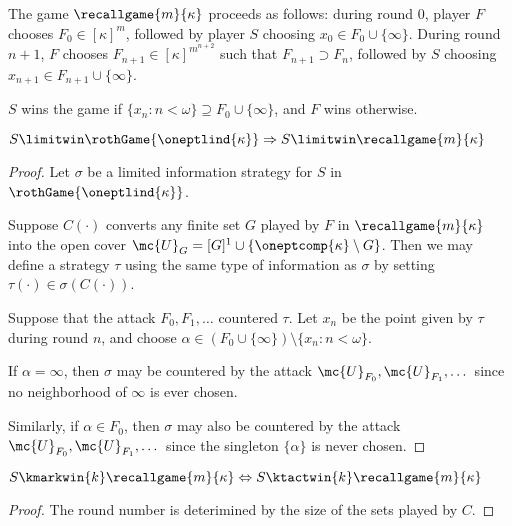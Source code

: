   \begin{defn}
    The game $\recallgame{m}{\kappa}$ proceeds as follows: during round $0$, player $F$ chooses $F_0\in[\kappa]^m$, followed by player $S$ choosing $x_0\in F_0\cup\{\infty\}$. During round $n+1$, $F$ chooses $F_{n+1}\in[\kappa]^{m^{n+2}}$ such that $F_{n+1}\supset F_n$, followed by $S$ choosing $x_{n+1}\in F_{n+1}\cup\{\infty\}$.

    $S$ wins the game if $\{x_n : n<\omega\}\supseteq F_0\cup\{\infty\}$, and $F$ wins otherwise.
  \end{defn}

  \begin{prop}
    $S\limitwin\rothGame{\oneptlind{\kappa}} \Rightarrow S\limitwin\recallgame{m}{\kappa}$
  \end{prop}

  \begin{proof}
    Let $\sigma$ be a limited information strategy for $S$ in $\rothGame{\oneptlind{\kappa}}$.

    Suppose $C(\cdot)$ converts any finite set $G$ played by $F$ in $\recallgame{m}{\kappa}$ into the open cover $\mc{U}_G=[G]^1\cup\{\oneptcomp{\kappa}\setminus G\}$. Then we may define a strategy $\tau$ using the same type of information as $\sigma$ by setting $\tau(\cdot)\in\sigma(C(\cdot))$.

    Suppose that the attack $F_0, F_1, \dots$ countered $\tau$. Let $x_n$ be the point given by $\tau$ during round $n$, and choose $\alpha\in (F_0\cup\{\infty\})\setminus \{x_n : n<\omega \}$.

    If $\alpha=\infty$, then $\sigma$ may be countered by the attack $\mc{U}_{F_0}, \mc{U}_{F_1}, \dots$ since no neighborhood of $\infty$ is ever chosen.

    Similarly, if $\alpha\in F_0$, then $\sigma$ may also be countered by the attack $\mc{U}_{F_0}, \mc{U}_{F_1}, \dots$ since the singleton $\{\alpha\}$ is never chosen.
  \end{proof}

  \begin{prop}
    $S\kmarkwin{k}\recallgame{m}{\kappa} \Leftrightarrow S\ktactwin{k}\recallgame{m}{\kappa}$
  \end{prop}

  \begin{proof}
    The round number is deterimined by the size of the sets played by $C$.
  \end{proof}